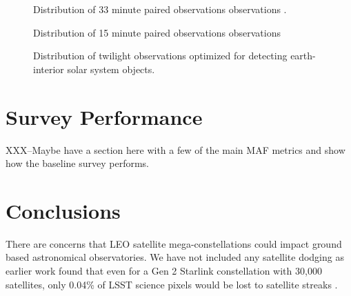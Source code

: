 \documentclass[]{aastex631}
\begin{document}
\begin{figure}
\caption{Distribution of 33 minute paired observations observations .\label{fig:tiers_pair33}}
\end{figure}


\begin{figure}
\caption{Distribution of 15 minute paired observations observations \label{fig:tiers_pair15}}
\end{figure}

\begin{figure}
\caption{Distribution of twilight observations optimized for detecting earth-interior solar system objects. \label{fig:tiers_twiinner}}
\end{figure}

\section{Survey Performance}

XXX--Maybe have a section here with a few of the main MAF metrics and show how the baseline survey performs.

\section{Conclusions}

There are concerns that LEO satellite mega-constellations could impact ground based astronomical observatories. We have not included any satellite dodging as earlier work found that even for a Gen 2 Starlink constellation with 30,000 satellites, only 0.04\% of LSST science pixels would be lost to satellite streaks \citep{Hu2022, Yoachim2025}.
\end{document}
